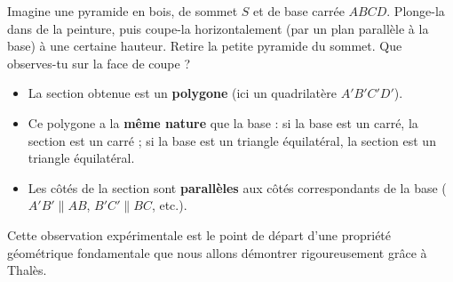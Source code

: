 \documentclass[11pt]{article}
\begin{document}
Imagine une pyramide en bois, de sommet $S$ et de base carrée $ABCD$. Plonge-la dans de la peinture, puis coupe-la horizontalement (par un plan parallèle à la base) à une certaine hauteur. Retire la petite pyramide du sommet. Que observes-tu sur la face de coupe ?
\begin{itemize}
    \item La section obtenue est un \textbf{polygone} (ici un quadrilatère $A'B'C'D'$).
    \item Ce polygone a la \textbf{même nature} que la base : si la base est un carré, la section est un carré ; si la base est un triangle équilatéral, la section est un triangle équilatéral.
    \item Les côtés de la section sont \textbf{parallèles} aux côtés correspondants de la base ($A'B' \parallel AB$, $B'C' \parallel BC$, etc.).
\end{itemize}

Cette observation expérimentale est le point de départ d'une propriété géométrique fondamentale que nous allons démontrer rigoureusement grâce à Thalès.
\end{document}
